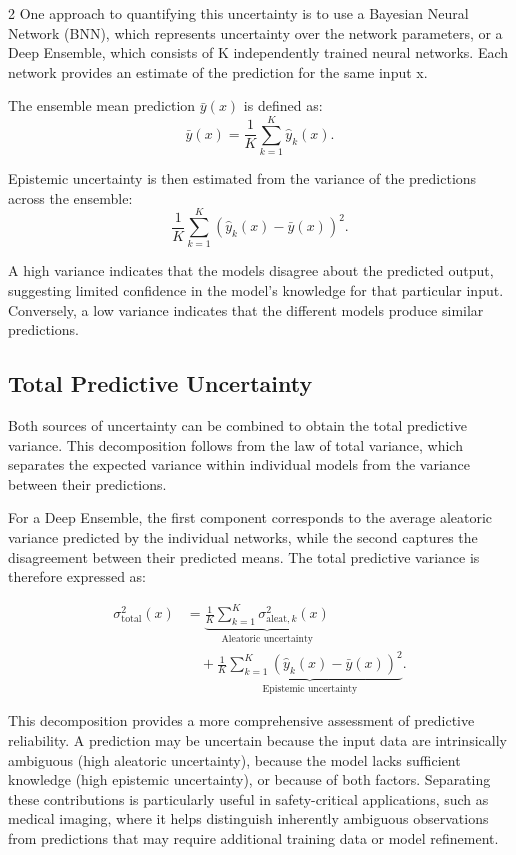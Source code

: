 \documentclass[10pt]{article}
\begin{document}
\begin{multicols}{2}
One approach to quantifying this uncertainty is to use a Bayesian Neural Network (BNN), 
which represents uncertainty over the network parameters, or a Deep Ensemble, 
which consists of K independently trained neural networks. 
Each network provides an estimate of the prediction for the same input x.

The ensemble mean prediction $\bar{y}(x)$ is defined as:
\begin{equation}
\bar{y}(x) = \frac{1}{K}
\sum_{k=1}^{K}
\hat{y}_k(x).
\end{equation}

Epistemic uncertainty is then estimated from the variance of the predictions across the ensemble:
\begin{equation}
\frac{1}{K}
\sum_{k=1}^{K}
\left(
\hat{y}_k(x)-\bar{y}(x)
\right)^2.
\end{equation}

A high variance indicates that the models disagree about the predicted output, 
suggesting limited confidence in the model's knowledge for that particular input. 
Conversely, a low variance indicates that the different models produce similar predictions.

\subsection{Total Predictive Uncertainty}
Both sources of uncertainty can be combined to obtain the total predictive variance. This decomposition follows from the law of total variance, which separates the expected variance within individual models from the variance between their predictions.

For a Deep Ensemble, the first component corresponds to the average aleatoric variance predicted by the individual networks, while the second captures the disagreement between their predicted means. The total predictive variance is therefore expressed as:

\begin{equation}
\begin{aligned}
\sigma^2_{\text{total}}(x)
&=
\underbrace{
\frac{1}{K}\sum_{k=1}^{K}
\sigma^2_{\text{aleat},k}(x)
}_{\text{Aleatoric uncertainty}}
\\[0.5em]
&\quad+
\underbrace{
\frac{1}{K}\sum_{k=1}^{K}
\left(
\hat{y}_k(x)-\bar{y}(x)
\right)^2
}_{\text{Epistemic uncertainty}}.
\end{aligned}
\end{equation}

This decomposition provides a more comprehensive assessment of predictive reliability. 
A prediction may be uncertain because the input data are intrinsically ambiguous (high aleatoric uncertainty), 
because the model lacks sufficient knowledge (high epistemic uncertainty), 
or because of both factors.
Separating these contributions is particularly useful in safety-critical applications, 
such as medical imaging, where it helps distinguish inherently ambiguous observations 
from predictions that may require additional training data or model refinement.


\end{multicols}
\end{document}
